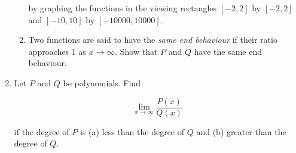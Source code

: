 \documentclass{article}
\begin{document}
\begin{enumerate}
\begin{enumerate}
			by graphing the functions in the viewing rectangles
			$[-2, 2]$ by $[-2,2]$ and $[-10, 10]$ by $[-10000, 10000]$.

			\item Two functions are said to have the \emph{same end behaviour} if their
			ratio approaches 1 as $x \to \infty$. Show that $P$ and $Q$ have the same end
			behaviour.
		\end{enumerate}

		\item Let $P$ and $Q$ be polynomials. Find

			$$\lim \limits _{x \to \infty} \frac{P(x)}{Q(x)}$$

			if the degree of $P$ is (a) less than the degree of $Q$ and (b) greater than the
			degree of $Q$.

	\end{enumerate}
\end{document}
